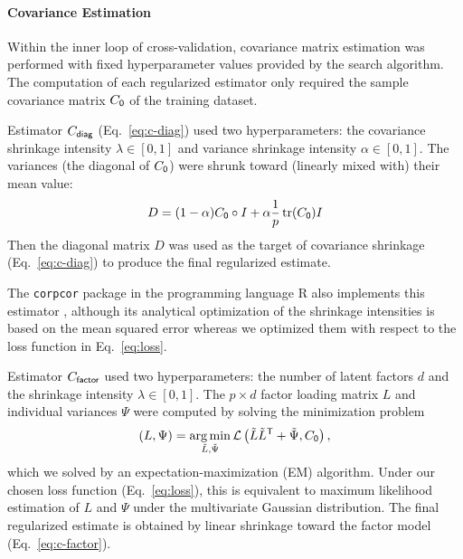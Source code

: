 \documentclass[10pt]{article}
\DeclareMathOperator{\Tr}{tr}
\newcommand{\loss}[1]{\mathcal L\left(#1\right)}
\newcommand{\T}{{\sf T}}
\DeclareMathOperator*{\argmin}{arg\,min}
\begin{document}
\paragraph{Covariance Estimation}
Within the inner loop of cross-validation, covariance matrix estimation was performed with fixed hyperparameter values provided by the search algorithm.  The computation of each regularized estimator only required the sample covariance matrix $C_{\sf 0}$ of the training dataset. 

Estimator $C_{\sf diag}$ (Eq.~\ref{eq:c-diag})  used two hyperparameters: the covariance shrinkage intensity $\lambda \in [0,1]$ and variance shrinkage intensity $\alpha \in [0,1]$.  The variances (the diagonal of $C_{\sf 0}$) were shrunk toward (linearly mixed with) their mean value:
\begin{equation}
D = (1-\alpha)C_{\sf 0}\circ I + \alpha \frac 1 p \Tr(C_{\sf 0}) I
\end{equation}
Then the diagonal matrix $D$ was used as the target of covariance shrinkage (Eq.~\ref{eq:c-diag}) to produce the final regularized estimate.

The {\tt corpcor} package in the programming language R also implements this estimator \cite{Schafer:2010}, although its analytical optimization of the shrinkage intensities is based on the mean squared error whereas we optimized them with respect to the loss function in Eq.~\ref{eq:loss}.

Estimator $C_{\sf factor}$ used two hyperparameters: the number of latent factors $d$ and the shrinkage intensity $\lambda \in [0, 1]$.  
The $p\times d$ factor loading matrix $L$ and individual variances $\Psi$ were computed by solving the minimization problem
\begin{equation}
(L,\Psi) = \argmin\limits_{\tilde L,\tilde\Psi} \loss{\tilde L \tilde L^\T + \tilde\Psi,C_{\sf 0}},
\end{equation}
which we solved by an expectation-maximization (EM) algorithm.  Under our chosen loss function (Eq.~\ref{eq:loss}), this is equivalent to maximum likelihood estimation of $L$ and $\Psi$ under the multivariate Gaussian distribution.  The final regularized estimate is obtained by linear shrinkage toward the factor model (Eq.~\ref{eq:c-factor}). 
\end{document}
